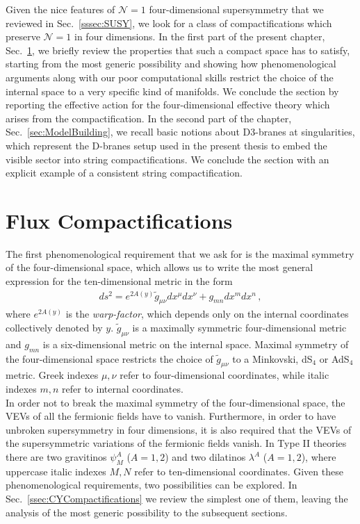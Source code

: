 \documentclass[12pt,a4paper]{book}
\begin{document}
Given the nice features of $\mathcal{N} = 1$ four-dimensional supersymmetry that we reviewed in Sec.~\ref{sssec:SUSY}, we look for a class of compactifications which preserve $\mathcal{N} = 1$ in four dimensions. In the first part of the present chapter, Sec.~\ref{sec:FluxCompactifications}, we briefly review the properties that such a compact space has to satisfy, starting from the most generic possibility and showing how phenomenological arguments along with our poor computational skills restrict the choice of the internal space to a very specific kind of manifolds. We conclude the section by reporting the effective action for the four-dimensional effective theory which arises from the compactification. In the second part of the chapter, Sec.~\ref{sec:ModelBuilding}, we recall basic notions about D3-branes at singularities, which represent the D-branes setup used in the present thesis to embed the visible sector into string compactifications. We conclude the section with an explicit example of a consistent string compactification.

\section{Flux Compactifications}
\label{sec:FluxCompactifications}

The first phenomenological requirement that we ask for is the maximal symmetry of the four-dimensional space, which allows us to write the most general expression for the ten-dimensional metric in the form
\begin{align}
\label{eq:GeneralMetric}
ds^2 = e^{2 A(y)} \tilde{g}_{\mu \nu} dx^\mu dx^\nu + g_{mn} dx^m dx^n \,,
\end{align}
where $e^{2 A(y)}$ is the \textit{warp-factor}, which depends only on the internal coordinates collectively denoted by $y$. $\tilde{g}_{\mu \nu}$ is a maximally symmetric four-dimensional metric and $g_{mn}$ is a six-dimensional metric on the internal space. Maximal symmetry of the four-dimensional space restricts the choice of $\tilde{g}_{\mu \nu}$ to a Minkovski, dS$_4$ or AdS$_4$ metric. Greek indexes $\mu, \nu$ refer to four-dimensional coordinates, while italic indexes $m, n$ refer to internal coordinates.\\

In order not to break the maximal symmetry of the four-dimensional space, the VEVs of all the fermionic fields have to vanish. Furthermore, in order to have unbroken supersymmetry in four dimensions, it is also required that the VEVs of the supersymmetric variations of the fermionic fields vanish. In Type II theories there are two gravitinos $\psi_M^A$ ($A = 1,2$) and two dilatinos $\lambda^A$ ($A = 1,2$), where uppercase italic indexes $M, N$ refer to ten-dimensional coordinates. Given these phenomenological requirements, two possibilities can be explored. In Sec.~\ref{ssec:CYCompactifications} we review the simplest one of them, leaving the analysis of the most generic possibility to the subsequent sections.
\end{document}
